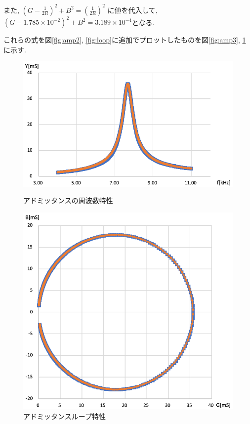 \documentclass[titlepage]{jsarticle}
\begin{document}
                また, $\displaystyle \left(G - \frac{1}{2R}\right)^2 + B^2 = \left(\frac{1}{2R}\right)^2$
                に値を代入して, $\displaystyle \left(G - 1.785 \times 10^{-2}\right)^2 + B^2 = 3.189 \times 10^{-4}$となる.
                
                これらの式を図\ref{fig:amp2}, \ref{fig:loop}に追加でプロットしたものを図\ref{fig:amp3}, \ref{fig:loop2}に示す.

                \begin{figure}[h]
                    \begin{minipage}{0.5\hsize}
                        \centering
                        \includegraphics[width=1\hsize]{images/amp3.png}
                        \caption{アドミッタンスの周波数特性}
                        \label{fig:amp3}
                    \end{minipage}
                    \begin{minipage}{0.5\hsize}
                        \centering
                        \includegraphics[width=0.9\hsize]{images/loop2.png}
                        \caption{アドミッタンスループ特性}
                        \label{fig:loop2}
                    \end{minipage}
                \end{figure}
\end{document}
